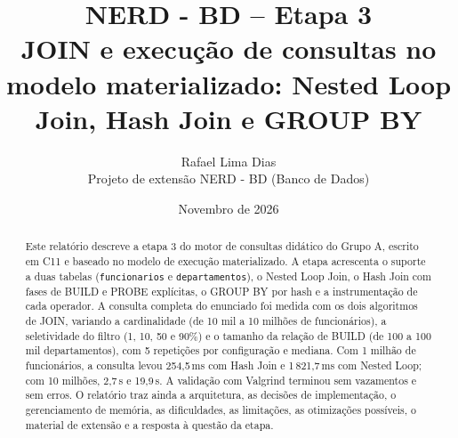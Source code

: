 \documentclass[11pt,a4paper]{article}
\title{NERD - BD -- Etapa 3\\\large JOIN e execução de consultas no modelo materializado: Nested Loop Join, Hash Join e GROUP BY}
\author{Rafael Lima Dias\\Projeto de extensão NERD - BD (Banco de Dados)}
\date{Novembro de 2026}
\begin{document}
\maketitle

\begin{abstract}
Este relatório descreve a etapa 3 do motor de consultas didático do Grupo A, escrito em C11 e baseado no modelo de execução materializado. A etapa acrescenta o suporte a duas tabelas (\texttt{funcionarios} e \texttt{departamentos}), o Nested Loop Join, o Hash Join com fases de BUILD e PROBE explícitas, o GROUP BY por hash e a instrumentação de cada operador. A consulta completa do enunciado foi medida com os dois algoritmos de JOIN, variando a cardinalidade (de 10 mil a 10 milhões de funcionários), a seletividade do filtro (1, 10, 50 e 90\%) e o tamanho da relação de BUILD (de 100 a 100 mil departamentos), com 5 repetições por configuração e mediana. Com 1 milhão de funcionários, a consulta levou 254,5\,ms com Hash Join e 1\,821,7\,ms com Nested Loop; com 10 milhões, 2,7\,s e 19,9\,s. A validação com Valgrind terminou sem vazamentos e sem erros. O relatório traz ainda a arquitetura, as decisões de implementação, o gerenciamento de memória, as dificuldades, as limitações, as otimizações possíveis, o material de extensão e a resposta à questão da etapa.
\end{abstract}
\end{document}
